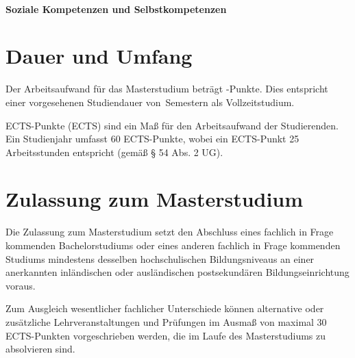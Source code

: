 \paragraph{Soziale Kompetenzen und Selbstkompetenzen}

\section{Dauer und Umfang}\label{sec:DU}

Der Arbeitsaufwand für das Masterstudium \emph{}
beträgt -Punkte. Dies entspricht einer vorgesehenen
Studiendauer von \,Semestern als Vollzeitstudium.

ECTS-Punkte (ECTS) sind ein Maß für den Arbeitsaufwand der Studierenden. 
Ein Studienjahr umfasst 60 ECTS­-Punkte, wobei ein ECTS-Punkt 25 
Arbeitsstunden entspricht (gemäß § 54 Abs. 2 UG).

\section{Zulassung zum Masterstudium}\label{sec:ZM}

\newcommand*\AuflagenZurHerstellungDerGleichwertigkeit{%
  \ifDEF{VerwendungAuflagen}{%
    \VAR{VerwendungAuflagen}%
  }{}%
}

Die Zulassung zum Masterstudium \emph{} setzt den Abschluss 
eines fachlich in Frage kommenden Bachelorstudiums oder eines anderen 
fachlich in Frage kommenden Studiums mindestens desselben hochschulischen 
Bildungsniveaus an einer anerkannten inländischen oder ausländischen 
postsekundären Bildungseinrichtung voraus. 

Zum Ausgleich wesentlicher fachlicher Unterschiede können alternative 
oder zusätzliche Lehrveranstaltungen und Prüfungen im Ausmaß von 
maximal 30 ECTS-Punkten vorgeschrieben werden, die im Laufe des 
Masterstudiums zu absolvieren sind.

%
\newcommand*\Deutsch[1][B2]{%
  Für einen erfolgreichen Studienfortgang werden Deutschkenntnisse
  nach Referenzniveau #1 des Gemeinsamen Europäischen
  Referenzrahmens für Sprachen empfohlen.%
}%
\newcommand*\Englisch{
  \par
  In einzelnen Lehrveranstaltungen kann der Vortrag in englischer
  Sprache stattfinden bzw.\ können die Unterlagen in englischer
  Sprache vorliegen. Daher werden Englischkenntnisse auf
  Referenzniveau B1 des Gemeinsamen Europäischen Referenzrahmens für
  Sprachen empfohlen.%
}%

